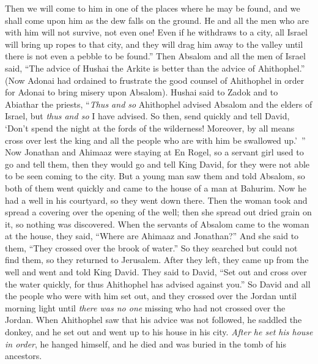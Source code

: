\begin{biblechapter}
\verse Then we will come to him in one of the places where he may be found, and we shall come upon him as the dew falls on the ground. He and all the men who are with him will not survive, not even one!
\verse Even if he withdraws to a city, all Israel will bring up ropes to that city, and they will drag him away to the valley until there is not even a pebble to be found.”
\verse Then Absalom and all the men of Israel said, “The advice of Hushai the Arkite is better than the advice of Ahithophel.” (Now Adonai had ordained to frustrate the good counsel of Ahithophel in order for Adonai to bring misery upon Absalom).
 Hushai said to Zadok and to Abiathar the priests, “\textit{Thus and so} Ahithophel advised Absalom and the elders of Israel, but \textit{thus and so} I have advised.
\verse So then, send quickly and tell David, ‘Don’t spend the night at the fords of the wilderness! Moreover, by all means cross over lest the king and all the people who are with him be swallowed up.’ ”
\verse Now Jonathan and Ahimaaz were staying at En Rogel, so a servant girl used to go and tell them, then they would go and tell King David, for they were not able to be seen coming to the city.
\verse But a young man saw them and told Absalom, so both of them went quickly and came to the house of a man at Bahurim. Now he had a well in his courtyard, so they went down there.
\verse Then the woman took and spread a covering over the opening of the well; then she spread out dried grain on it, so nothing was discovered.
\verse When the servants of Absalom came to the woman at the house, they said, “Where are Ahimaaz and Jonathan?” And she said to them, “They crossed over the brook of water.” So they searched but could not find them, so they returned to Jerusalem.
\verse After they left, they came up from the well and went and told King David. They said to David, “Set out and cross over the water quickly, for thus Ahithophel has advised against you.”
\verse So David and all the people who were with him set out, and they crossed over the Jordan until morning light until \textit{there was no one} missing who had not crossed over the Jordan.
\verse When Ahithophel saw that his advice was not followed, he saddled the donkey, and he set out and went up to his house in his city. \textit{After he set his house in order}, he hanged himself, and he died and was buried in the tomb of his ancestors.

\end{biblechapter}

